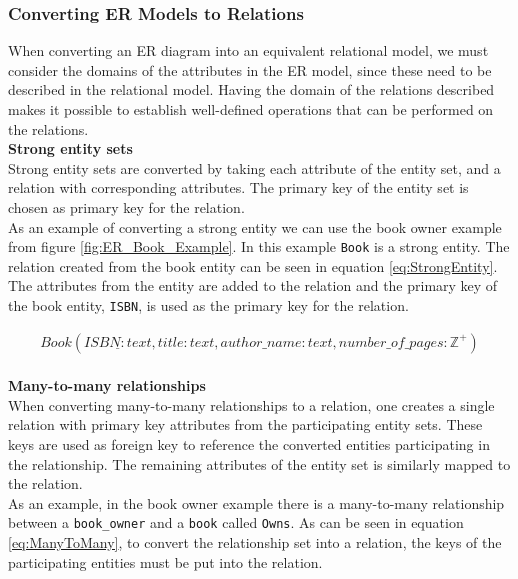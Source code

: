 \subsubsection*{Converting ER Models to Relations}
When converting an ER diagram into an equivalent relational model, we must consider the domains of the attributes in the ER model, since these need to be described in the relational model. Having the domain of the relations described makes it possible to establish well-defined operations that can be performed on the relations.\\
\textbf{Strong entity sets}\\
Strong entity sets are converted by taking each attribute of the entity set, and a relation with corresponding attributes. 
The primary key of the entity set is chosen as primary key for the relation\cite{DBSBook}.\\
As an example of converting a strong entity we can use the book owner example from figure \ref{fig:ER_Book_Example}. In this example \texttt{Book} is a strong entity. The relation created from the book entity can be seen in equation \ref*{eq:StrongEntity}. The attributes from the entity are added to the relation and the primary key of the book entity, \texttt{ISBN}, is used as the primary key for the relation.

\begin{equation}\label{eq:StrongEntity}
    \begin{split}
        Book(\underline{ISBN : text} , title : text , author\_name : text , number\_of\_pages : \mathbb{Z}^+)
    \end{split}
\end{equation}
\\
\textbf{Many-to-many relationships}\\
When converting many-to-many relationships to a relation, one creates a single relation with primary key attributes from the participating entity sets\cite{DBSBook}. These keys are used as foreign key to reference the converted entities participating in the relationship. 
The remaining attributes of the entity set is similarly mapped to the relation.\\
As an example, in the book owner example there is a many-to-many relationship between a \texttt{book\_owner} and a \texttt{book} called \texttt{Owns}. As can be seen in equation \ref{eq:ManyToMany}, to convert the relationship set into a relation, the keys of the participating entities must be put into the relation. 

